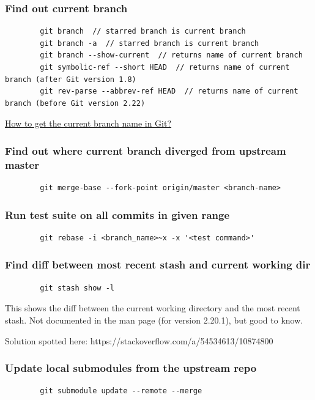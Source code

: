 \begin{frame}[fragile]
    \frametitle{Find out current branch}
    \begin{verbatim}
        git branch  // starred branch is current branch
        git branch -a  // starred branch is current branch
        git branch --show-current  // returns name of current branch
        git symbolic-ref --short HEAD  // returns name of current branch (after Git version 1.8)
        git rev-parse --abbrev-ref HEAD  // returns name of current branch (before Git version 2.22)
    \end{verbatim}
    \href{https://stackoverflow.com/questions/6245570/how-to-get-the-current-branch-name-in-git}{How to get the current branch name in Git?}
\end{frame}

\begin{frame}[fragile]
    \frametitle{Find out where current branch diverged from upstream master}
    \begin{verbatim}
        git merge-base --fork-point origin/master <branch-name>
    \end{verbatim}
\end{frame}

\begin{frame}[fragile]
    \frametitle{Run test suite on all commits in given range}
    \begin{verbatim}
        git rebase -i <branch_name>~x -x '<test command>'
    \end{verbatim}
\end{frame}

\begin{frame}[fragile]
    \frametitle{Find diff between most recent stash and current working dir}
    \begin{verbatim}
        git stash show -l
    \end{verbatim}

    This shows the diff between the current working directory and the most
    recent stash. Not documented in the  man page (for version
    2.20.1), but good to know.

    Solution spotted here: https://stackoverflow.com/a/54534613/10874800
\end{frame}

\begin{frame}[fragile]
    \frametitle{Update local submodules from the upstream repo}

    \begin{verbatim}
        git submodule update --remote --merge
    \end{verbatim}
\end{frame}

